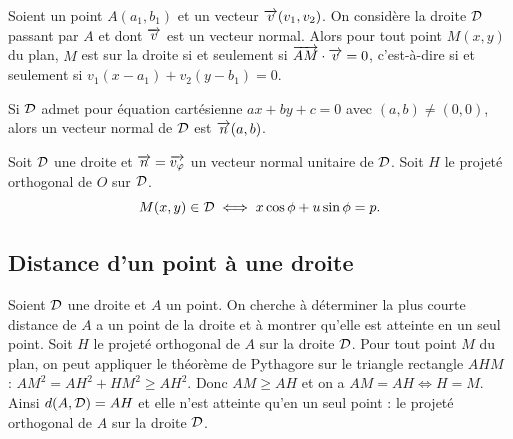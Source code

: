 \begin{prop}
  Soient un point \(A(a_1 , b_1)\) et un vecteur \(\overrightarrow{v}(v_1 , v_2)\). On
  considère la droite \(\mathcal{D}\) passant par \(A\) et dont \(\overrightarrow{v}\) est un vecteur
  normal.  Alors pour tout point \(M(x , y)\) du plan, \(M\) est sur la droite
  si et seulement si \(\overrightarrow{AM}\cdot\overrightarrow{v} = 0\), c'est-à-dire si et seulement
  si \(v_1(x - a_1) + v_2(y - b_1) = 0\).
\end{prop}

Si \(\mathcal{D}\) admet pour équation cartésienne \(ax + by + c = 0\) avec \((a , b)
\neq (0 , 0)\), alors un vecteur normal de \(\mathcal{D}\) est \(\overrightarrow{n}(a , b)\).

\begin{prop}
  Soit \(\mathcal{D}\) une droite et \(\overrightarrow{n} = \overrightarrow{v_\varphi}\) un vecteur normal
  unitaire de \(\mathcal{D}\). Soit \(H\) le projeté orthogonal de \(O\) sur \(\mathcal{D}\).
  \begin{equation}
    M(x , y) \in \mathcal{D} \iff x\cos\phi + u \sin\phi = p.
  \end{equation}
\end{prop}

\subsection{Distance d'un point à une droite}

Soient \(\mathcal{D}\) une droite et \(A\) un point. On cherche à déterminer la plus
courte distance de \(A\) a un point de la droite et à montrer qu'elle est
atteinte en un seul point. Soit \(H\) le projeté orthogonal de \(A\) sur la
droite \(\mathcal{D}\). Pour tout point \(M\) du plan, on peut appliquer le théorème
de Pythagore sur le triangle rectangle \(AHM\) : \(AM^2 = AH^2 + HM^2
\geqslant AH^2\). Donc \(AM \geqslant AH\) et on a \(AM = AH \iff H = M\).
Ainsi \(d(A , \mathcal{D}) = AH\) et elle n'est atteinte qu'en un seul point : le
projeté orthogonal de \(A\) sur la droite \(\mathcal{D}\).

